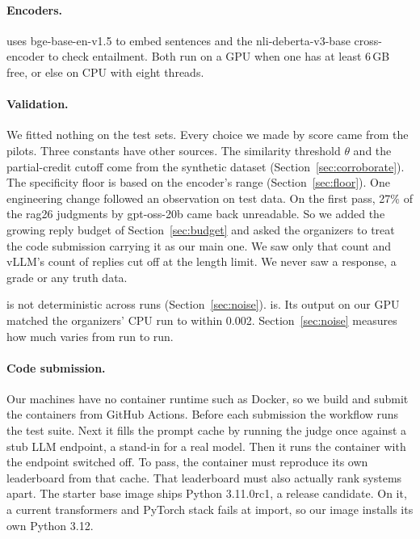 \paragraph{Encoders.}  uses bge-base-en-v1.5 to embed
sentences and the nli-deberta-v3-base cross-encoder to check entailment. Both run
on a GPU when one has at least 6\,GB free, or else on CPU with eight threads.

\paragraph{Validation.} We fitted nothing on the test sets. Every choice we made by
score came from the pilots. Three  constants have other
sources. The similarity threshold $\theta$ and the partial-credit cutoff come from the synthetic
dataset (Section~\ref{sec:corroborate}). The specificity floor is based on the
encoder's range (Section~\ref{sec:floor}). One engineering change followed an
observation on test data. On the first pass, 27\% of the rag26 judgments by gpt-oss-20b came back
unreadable. So we added the growing reply budget of Section~\ref{sec:budget} and
asked the organizers to treat the code submission carrying it as our main one. We
saw only that count and vLLM's count of replies cut off at the length limit. We
never saw a response, a grade or any truth data.

 is not deterministic across runs (Section~\ref{sec:noise}).
 is. Its output on our GPU matched the organizers' CPU run to
within 0.002. Section~\ref{sec:noise} measures how much  varies from run to run.

\paragraph{Code submission.} Our machines have no container runtime such as
Docker, so we build and submit the containers from GitHub Actions. Before each
submission the workflow runs the test suite. Next it fills the prompt
cache by running the judge once against a stub LLM endpoint, a stand-in for a
real model. Then it runs the container with the endpoint switched off. To pass, the container must
reproduce its own leaderboard from that cache. That leaderboard must also actually
rank systems apart. The starter base image ships Python 3.11.0rc1, a release
candidate. On it, a current transformers and PyTorch stack fails at import, so our
image installs its own Python 3.12.
